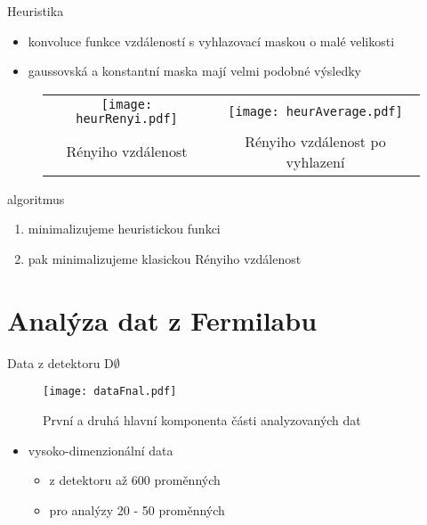 \documentclass[11pt]{beamer}
\newcommand{\dzero}{D$\emptyset$ }
\begin{document}
\begin{frame}{Heuristika}
\begin{itemize}
\item konvoluce funkce vzdáleností s vyhlazovací maskou o malé velikosti
\item gaussovská a konstantní maska mají velmi podobné výsledky
\end{itemize}
    \vspace{-0.3in}
	\begin{figure}[htb]
	\begin{tabular}{cc}
		\texttt{[image: heurRenyi.pdf]}
		&
		\texttt{[image: heurAverage.pdf]}			
		\\
		{\footnotesize Rényiho vzdálenost}
		&
		{\footnotesize Rényiho vzdálenost po vyhlazení}	
		
	\end{tabular}
	\end{figure}
	\pause
	algoritmus
	\begin{enumerate}
	\item minimalizujeme heuristickou funkci
	\item pak minimalizujeme klasickou Rényiho vzdálenost
	\end{enumerate}

\end{frame}

\section{Analýza dat z Fermilabu}
\begin{frame}{Data z detektoru \dzero}
	\vspace{-0.3in}
	\begin{figure}
	\texttt{[image: dataFnal.pdf]}
	\caption{\footnotesize První a druhá hlavní komponenta části analyzovaných dat}
	\end{figure}
	\vspace{-0.2in}
\begin{itemize}
	\item vysoko-dimenzionální data 
	\begin{itemize}
	\item z detektoru až 600 proměnných
	\item pro analýzy 20 - 50 proměnných
	\end{itemize}
\end{itemize}\end{frame}
\end{document}
